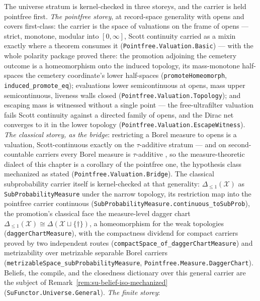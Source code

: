 \begin{remark}
\label{rem:su-judgment-mechanized}
\sloppy
The universe stratum is kernel-checked in three storeys, and the
carrier is held pointfree first. \emph{The pointfree storey}, at
record-space generality with opens and covers first-class: the
carrier is the space of valuations on the frame of opens --- strict,
monotone, modular into $[0,\infty]$, Scott continuity carried as a
mixin exactly where a theorem consumes it
(\texttt{Pointfree.Valuation.Basic}) --- with the whole polarity
package proved there: the promotion adjoining the cemetery outcome
is a homeomorphism onto the induced topology, its mass-monotone
half-spaces the cemetery coordinate's lower half-spaces
(\texttt{promoteHomeomorph}, \texttt{induced\_promote\_eq});
evaluations lower semicontinuous at opens, mass upper
semicontinuous, liveness walls closed
(\texttt{Pointfree.Valuation.Topology}); and escaping mass is
witnessed without a single point --- the free-ultrafilter valuation
fails Scott continuity against a directed family of opens, and the
Dirac net converges to it in the lower topology
(\texttt{Pointfree.Valuation.EscapeWitness}). \emph{The classical
storey, as the bridge}: restricting a Borel measure to opens is a
valuation, Scott-continuous exactly on the $\tau$-additive stratum
--- and on second-countable carriers every Borel measure is
$\tau$-additive \cite[414O]{fremlin4}, so the measure-theoretic
dialect of this chapter is a corollary of the pointfree one, the
hypothesis class mechanized as stated
(\texttt{Pointfree.Valuation.Bridge}). The classical subprobability
carrier itself is kernel-checked at that generality:
$\Delta_{\le 1}(\mathcal{X})$ as \texttt{SubProbabilityMeasure}
under the narrow topology, its restriction map into the pointfree
carrier continuous
(\texttt{SubProbabilityMeasure.continuous\_toSubProb}), the
promotion's classical face the measure-level dagger chart
$\Delta_{\le 1}(\mathcal{X}) \cong
\Delta(\mathcal{X} \sqcup \{\dagger\})$, a
homeomorphism for the weak topologies (\texttt{daggerChartMeasure}),
with the compactness dividend for compact carriers proved by two
independent routes
(\texttt{compactSpace\_of\_daggerChartMeasure}) and metrizability
over metrizable separable Borel carriers
(\texttt{metrizableSpace\_subProbabilityMeasure},
\texttt{Pointfree.Measure.DaggerChart}). Beliefs, the compile,
and the closedness dictionary over this general carrier are the
subject of Remark~\ref{rem:su-belief-iso-mechanized}
(\texttt{SuFunctor.Universe.General}). \emph{The finite storey}:

\end{remark}
